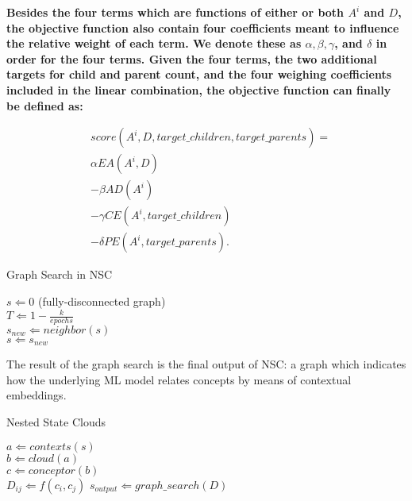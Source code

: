 \textbf{Besides the four terms which are functions of either or both $A^i$ and $D$, the objective function also contain four coefficients meant to influence the relative weight of each term. We denote these as $\alpha, \beta, \gamma$, and $\delta$ in order for the four terms. Given the four terms, the two additional targets for child and parent count, and the four weighing coefficients included in the linear combination, the objective function can finally be defined as:}


\begin{align*}
    & score(A^i, D, target\_children, target\_parents) = \\
    & \alpha EA(A^i, D) \\
    & - \beta AD(A^i) \\
    & - \gamma CE(A^i, target\_children) \\
    & - \delta PE(A^i, target\_parents).
\end{align*}

\begin{algorithm}[!tbp] 
    \caption{Graph Search in NSC}
    \label{alg:gs}
    \begin{algorithmic}
        \STATE $s \Leftarrow 0 $ (fully-disconnected graph) \\
        \STATE $T \Leftarrow 1 - \frac{k}{epochs}$ \\
        \STATE $s_{new} \Leftarrow neighbor(s)$ \\
            \STATE $s \Leftarrow s_{new}$
        \ENDIF
        \ENDFOR
    \end{algorithmic}
\end{algorithm}

The result of the graph search is the final output of NSC: a graph which indicates how the underlying ML model relates concepts by means of contextual embeddings.

\begin{algorithm}[!tbp] 
    \caption{Nested State Clouds}
    \label{alg:gs}
    \begin{algorithmic}
            \STATE $a \Leftarrow contexts(s)$ \\
            \STATE $b \Leftarrow cloud(a)$ \\
            \STATE $c \Leftarrow conceptor(b)$ \\
        \ENDFOR
                \STATE $D_{ij} \Leftarrow f(c_i, c_j)$
            \ENDFOR
        \ENDFOR
        \STATE $s_{output} \Leftarrow graph\_search(D)$
    \end{algorithmic}
\end{algorithm}